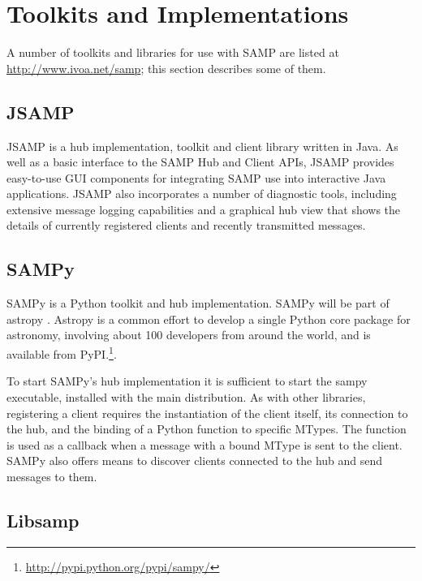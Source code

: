 \documentclass[11pt,twoside]{article}
\begin{document}
\section{Toolkits and Implementations}
\label{sec:B2_libs}

A number of toolkits and libraries for use with SAMP are listed at
\url{http://www.ivoa.net/samp}; this section describes some of them.

\subsection{JSAMP}

JSAMP is a hub implementation, toolkit and client library written in Java.
As well as a
basic interface to the SAMP Hub and Client APIs,
JSAMP provides easy-to-use GUI components
for integrating SAMP use into interactive Java applications.
JSAMP also incorporates a number of diagnostic tools,
including extensive message logging capabilities and
a graphical hub view that shows the details of currently registered
clients and recently transmitted messages.

\subsection{SAMPy}

SAMPy is a Python toolkit and hub implementation.
SAMPy will be part of 
astropy \citep{O30_adassxxii}. Astropy is
a common effort to develop a single Python core
package for astronomy, involving about 100 developers from around the world,
and is available from PyPI.\footnote{\url{http://pypi.python.org/pypi/sampy/}}.

To start SAMPy's hub implementation it is sufficient to start the sampy
executable, installed with the main distribution. As with other libraries,
registering a client requires the instantiation of the client itself, its
connection to the hub, and the binding of a Python function to specific
MTypes. The function is used as a callback when a message with a bound
MType is sent to the client. SAMPy also offers means to discover clients
connected to the hub and send messages to them.

\subsection{Libsamp}
\end{document}
